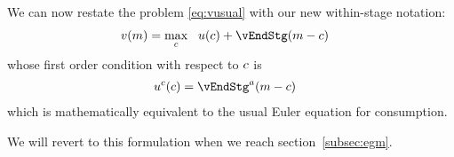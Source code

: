 \documentclass[SolvingMicroDSOPs]{subfiles}
\begin{document}

We can now restate the problem \eqref{eq:vusual} with our new within-stage notation:
\begin{equation}\begin{gathered}\begin{aligned}
      \vFunc(m) & = \max_{\cNrm} ~~ \uFunc(\cNrm)+ \vEndStg(\mNrm-\cNrm)
\end{aligned}\end{gathered}\end{equation}
whose first order condition with respect to $c$ is
\begin{equation}\begin{gathered}\begin{aligned}
  \uFunc^{\cNrm}(\cNrm) &= \vEndStg^{\aNrm}(\mNrm-\cNrm)  \label{eq:upEqbetaOp} %
\end{aligned}\end{gathered}\end{equation}
which is mathematically equivalent to the usual Euler equation for consumption.

We will revert to this formulation when we reach section~\ref{subsec:egm}.

\end{document}
